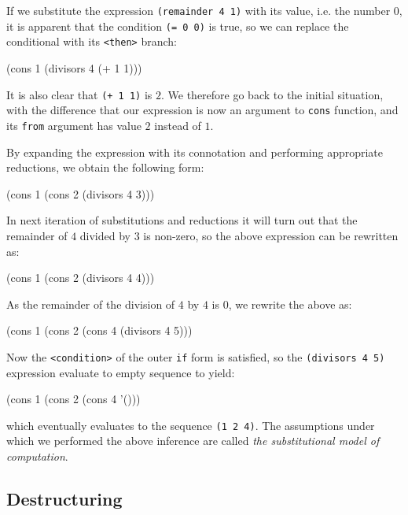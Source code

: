 If we substitute the expression \texttt{(remainder 4 1)} with
its value, i.e. the number $0$, it is apparent that the
condition \texttt{(= 0 0)} is true, so we can replace the
conditional with its \texttt{<then>} branch:

\begin{Snippet}
(cons 1 (divisors 4 (+ 1 1)))
\end{Snippet}

It is also clear that \texttt{(+ 1 1)} is $2$. We therefore
go back to the initial situation, with the difference that
our expression is now an argument to \texttt{cons} function,
and its \texttt{from} argument has value $2$ instead of $1$.

By expanding the expression with its connotation and performing
appropriate reductions, we obtain the following form:

\begin{Snippet}
(cons 1 (cons 2 (divisors 4 3)))
\end{Snippet}

In next iteration of substitutions and reductions it will
turn out that the remainder of $4$ divided by $3$ is non-zero,
so the above expression can be rewritten as:

\begin{Snippet}
(cons 1 (cons 2 (divisors 4 4)))


\end{Snippet}

As the remainder of the division of $4$ by $4$ is 0, we
rewrite the above as:

\begin{Snippet}
(cons 1 (cons 2 (cons 4 (divisors 4 5)))
\end{Snippet}

Now the \texttt{<condition>} of the outer \texttt{if} form
is satisfied, so the \texttt{(divisors 4 5)} expression evaluate
to empty sequence to yield:

\begin{Snippet}
(cons 1 (cons 2 (cons 4 '()))
\end{Snippet}

which eventually evaluates to the sequence \texttt{(1 2 4)}.
The assumptions under which we performed the above inference
are called \textit{the substitutional model of computation}.

\subsection{Destructuring}

